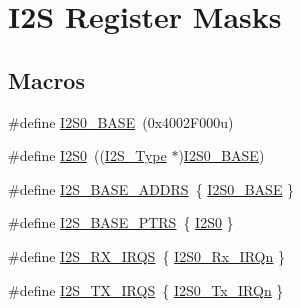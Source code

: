 \hypertarget{group___i2_s___register___masks}{}\section{I2S Register Masks}
\label{group___i2_s___register___masks}
\subsection*{Macros}
\begin{DoxyCompactItemize}
\item 
\#define \mbox{\hyperlink{group___i2_s___register___masks_ga7441a9fd88c69575185aa87244e12f85}{I2\+S0\+\_\+\+B\+A\+SE}}~(0x4002\+F000u)
\item 
\#define \mbox{\hyperlink{group___i2_s___register___masks_gadb0838291c90975e284e5f6a112f5877}{I2\+S0}}~((\mbox{\hyperlink{struct_i2_s___type}{I2\+S\+\_\+\+Type}} $\ast$)\mbox{\hyperlink{group___i2_s___register___masks_ga7441a9fd88c69575185aa87244e12f85}{I2\+S0\+\_\+\+B\+A\+SE}})
\item 
\#define \mbox{\hyperlink{group___i2_s___register___masks_ga1c0a8f15fa8e40ce9442ca976e76cb56}{I2\+S\+\_\+\+B\+A\+S\+E\+\_\+\+A\+D\+D\+RS}}~\{ \mbox{\hyperlink{group___i2_s___register___masks_ga7441a9fd88c69575185aa87244e12f85}{I2\+S0\+\_\+\+B\+A\+SE}} \}
\item 
\#define \mbox{\hyperlink{group___i2_s___register___masks_gad4496321b78d6de21d7434afb80480b5}{I2\+S\+\_\+\+B\+A\+S\+E\+\_\+\+P\+T\+RS}}~\{ \mbox{\hyperlink{group___i2_s___register___masks_gadb0838291c90975e284e5f6a112f5877}{I2\+S0}} \}
\item 
\#define \mbox{\hyperlink{group___i2_s___register___masks_gaeca92f0fb02a87f382733e4349168b02}{I2\+S\+\_\+\+R\+X\+\_\+\+I\+R\+QS}}~\{ \mbox{\hyperlink{group___interrupt__vector__numbers_gga666eb0caeb12ec0e281415592ae89083a4acd0a9915530c775f9da7a330800942}{I2\+S0\+\_\+\+Rx\+\_\+\+I\+R\+Qn}} \}
\item 
\#define \mbox{\hyperlink{group___i2_s___register___masks_ga71c7ba45e8e9d63f5ee14e4048ce1238}{I2\+S\+\_\+\+T\+X\+\_\+\+I\+R\+QS}}~\{ \mbox{\hyperlink{group___interrupt__vector__numbers_gga666eb0caeb12ec0e281415592ae89083a4448f20d9ed3dc1f3a578593a63875ae}{I2\+S0\+\_\+\+Tx\+\_\+\+I\+R\+Qn}} \}
\end{DoxyCompactItemize}
